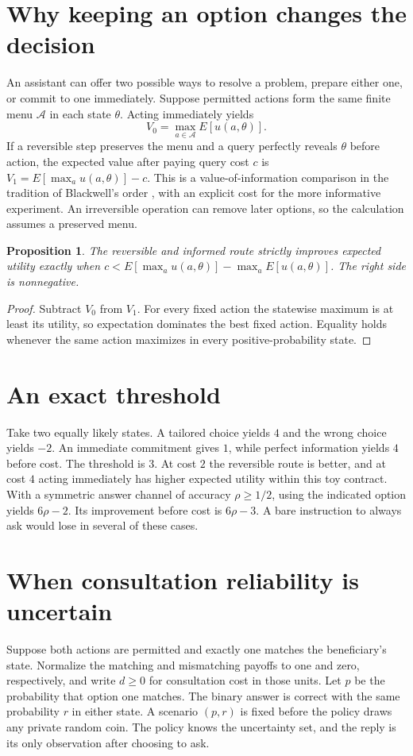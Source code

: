 \documentclass[11pt]{article}
\newtheorem{proposition}{Proposition}
\begin{document}
\section{Why keeping an option changes the decision}
An assistant can offer two possible ways to resolve a problem,
prepare either one, or commit to one immediately. Suppose permitted
actions form the same finite menu $\mathcal A$ in each state
$\theta$. Acting immediately yields
\[
 V_0=\max_{a\in\mathcal A}E[u(a,\theta)].
\]
If a reversible step preserves the menu and a query perfectly
reveals $\theta$ before action, the expected value after paying
query cost $c$ is $V_1=E[\max_a u(a,\theta)]-c$.
This is a value-of-information comparison in the tradition of
Blackwell's order \cite{rauh}, with an explicit cost for the more
informative experiment. An irreversible operation can remove later
options, so the calculation assumes a preserved menu.

\begin{proposition}
The reversible and informed route strictly improves expected
utility exactly when
$c<E[\max_a u(a,\theta)]-\max_a E[u(a,\theta)]$.
The right side is nonnegative.
\end{proposition}
\begin{proof}
Subtract $V_0$ from $V_1$. For every fixed action the statewise
maximum is at least its utility, so expectation dominates the
best fixed action. Equality holds whenever the same action
maximizes in every positive-probability state.
\end{proof}

\section{An exact threshold}
Take two equally likely states. A tailored choice yields $4$
and the wrong choice yields $-2$. An immediate commitment gives
$1$, while perfect information yields $4$ before cost. The
threshold is $3$. At cost $2$ the reversible route is better,
and at cost $4$ acting immediately has higher expected utility
within this toy contract. With a symmetric answer channel of
accuracy $\rho\geq1/2$, using the indicated option yields
$6\rho-2$. Its improvement before cost is $6\rho-3$. A
bare instruction to always ask would lose in several of these
cases.

\section{When consultation reliability is uncertain}
Suppose both actions are permitted and exactly one matches the
beneficiary's state. Normalize the matching and mismatching payoffs
to one and zero, respectively, and write $d\ge0$ for consultation
cost in those units. Let $p$ be the probability that option one
matches. The binary answer is correct with the same probability
$r$ in either state. A scenario $(p,r)$ is fixed before the policy
draws any private random coin. The policy knows the uncertainty
set, and the reply is its only observation after choosing to ask.
\end{document}
